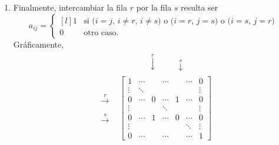 \documentclass[handout]{beamer} %
\renewcommand{\_}[1]{_{\left[ #1 \right]}}
\renewcommand{\^}[1]{^{\left[ #1 \right]}}
\begin{document}
\begin{frame}
    \begin{enumerate}
    \item[\color{blue}{E3.}]  Finalmente, intercambiar la fila $r$ por la fila $s$ resulta ser
        \begin{equation*}\label{elem-tipo-3}
        a_{ij} = \left\{ 
        \begin{matrix*}[l]
        1 &\text{si ($i=j$, $i \ne r$, $i \ne s$) o ($i=r$, $j=s$) o ($i=s$, $j=r$) }\\
        0 \quad&\text{otro caso.}
        \end{matrix*}\right.
        \end{equation*}\pause
        Gráficamente, 
            {\footnotesize
                \begin{align*}
        &\begin{matrix}
        {}^{}&{}^{}&{}^{}&{}^{}&\overset{r}{\downarrow}&{}^{}&{}^{}&{}^{}{}^{}\overset{s}{\downarrow}&{}^{}
        \end{matrix} \\
        \begin{matrix}
        {}^{}\\{}^{}\\
        \overset{r}{\to}\\
        {}^{}\\
        \overset{s}{\to}\\{}^{}\\
        {}^{}
        \end{matrix}
        &\begin{bmatrix}
        1 & \cdots &  &\cdots &&\cdots& 0  \\
        \vdots  & \ddots  & & &&& \vdots \\
        0 & \cdots &0 &\cdots&1&\cdots &0 \\
        \vdots  &   & &\ddots &&& \vdots \\
        0  & \cdots  &1 &\cdots &0& \cdots& 0 \\
        \vdots  &   & & &&\ddots& \vdots \\
        0  & \cdots  & &\cdots &&\cdots& 1
        \end{bmatrix}\tag{E3}
        \end{align*}
        }
    \end{enumerate}
\end{frame}
\end{document}
